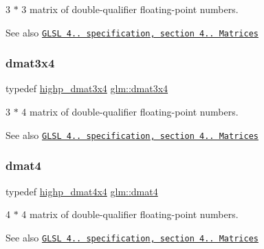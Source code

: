 3 $\ast$ 3 matrix of double-\/qualifier floating-\/point numbers.

\begin{DoxySeeAlso}{See also}
\href{http://www.opengl.org/registry/doc/GLSLangSpec.4.20.8.pdf}{\tt G\+L\+SL 4.. specification, section 4.. Matrices} 
\end{DoxySeeAlso}
\mbox{\label{group__core__types_ga19e745a83cba85f57afa1232276dcc96}} 
\subsubsection{\texorpdfstring{dmat3x4}{dmat3x4}}
{\footnotesize\ttfamily typedef \hyperlink{group__core__precision_ga21d3883c59ff3949404de6713e86c89e}{highp\+\_\+dmat3x4} \hyperlink{group__core__types_ga19e745a83cba85f57afa1232276dcc96}{glm\+::dmat3x4}}

3 $\ast$ 4 matrix of double-\/qualifier floating-\/point numbers.

\begin{DoxySeeAlso}{See also}
\href{http://www.opengl.org/registry/doc/GLSLangSpec.4.20.8.pdf}{\tt G\+L\+SL 4.. specification, section 4.. Matrices} 
\end{DoxySeeAlso}
\mbox{\label{group__core__types_ga7f7c1300ebfd19d573e9deb1e8758b54}} 
\subsubsection{\texorpdfstring{dmat4}{dmat4}}
{\footnotesize\ttfamily typedef \hyperlink{group__core__precision_gad3df38df8c4f7ef9b38f03581ff60142}{highp\+\_\+dmat4x4} \hyperlink{group__core__types_ga7f7c1300ebfd19d573e9deb1e8758b54}{glm\+::dmat4}}

4 $\ast$ 4 matrix of double-\/qualifier floating-\/point numbers.

\begin{DoxySeeAlso}{See also}
\href{http://www.opengl.org/registry/doc/GLSLangSpec.4.20.8.pdf}{\tt G\+L\+SL 4.. specification, section 4.. Matrices} 
\end{DoxySeeAlso}
\mbox{\label{group__core__types_gab3d51ce41e6f0aa267d3e185cee09c44}} 
